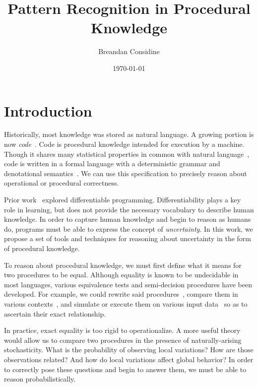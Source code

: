 \documentclass[11pt]{article}
\title{Pattern Recognition in Procedural Knowledge}
\author{Breandan Considine}
\date{\today}
\begin{document}
    \maketitle

    \tableofcontents
    \pagebreak

    \section{Introduction}

    Historically, most knowledge was stored as natural language. A growing portion is now \textit{code}~\citep{allamanis2018survey}. Code is procedural knowledge intended for execution by a machine. Though it shares many statistical properties in common with natural language~\citep{hindle2012naturalness}, code is written in a formal language with a deterministic grammar and denotational semantics~\citep{pierce2010software}. We can use this specification to precisely reason about operational or procedural correctness.

    Prior work~\citep{considine2019programming} explored differentiable programming. Differentiability plays a key role in learning, but does not provide the necessary vocabulary to describe human knowledge. In order to capture human knowledge and begin to reason as humans do, programs must be able to express the concept of \textit{uncertainty}. In this work, we propose a set of tools and techniques for reasoning about uncertainty in the form of procedural knowledge.

    To reason about procedural knowledge, we must first define what it means for two procedures to be equal. Although equality is known to be undecidable in most languages, various equivalence tests and semi-decision procedures have been developed. For example, we could rewrite said procedures~\citep{baader1999term}, compare them in various contexts~\citep{felleisen1990expressive}, and simulate or execute them on various input data~\citep{chen2020metamorphic} so as to ascertain their exact relationship.

    In practice, exact equality is too rigid to operationalize. A more useful theory would allow us to compare two procedures in the presence of naturally-arising stochasticity. What is the probability of observing local variations? How are those observations related? And how do local variations affect global behavior? In order to correctly pose these questions and begin to answer them, we must be able to reason probabilistically.
\end{document}
